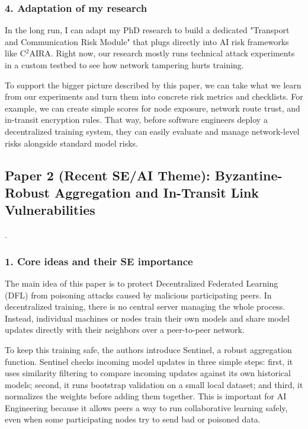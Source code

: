 \documentclass[11pt,a4paper]{article}
\begin{document}
\subsubsection*{4. Adaptation of my research}

In the long run, I can adapt my PhD research to build a dedicated "Transport and Communication Risk Module" that plugs directly into AI risk frameworks like C$^2$AIRA. Right now, our research mostly runs technical attack experiments in a custom testbed to see how network tampering hurts training.

To support the bigger picture described by this paper, we can take what we learn from our experiments and turn them into concrete risk metrics and checklists. For example, we can create simple scores for node exposure, network route trust, and in-transit encryption rules. That way, before software engineers deploy a decentralized training system, they can easily evaluate and manage network-level risks alongside standard model risks.

\subsection{Paper 2 (Recent SE/AI Theme): Byzantine-Robust Aggregation and In-Transit Link Vulnerabilities \cite{feng2024sentinel}}.

\subsubsection*{1. Core ideas and their SE importance}

The main idea of this paper is to protect Decentralized Federated Learning (DFL) from poisoning attacks caused by malicious participating peers. In decentralized training, there is no central server managing the whole process. Instead, individual machines or nodes train their own models and share model updates directly with their neighbors over a peer-to-peer network.

To keep this training safe, the authors introduce Sentinel, a robust aggregation function. Sentinel checks incoming model updates in three simple steps: first, it uses similarity filtering to compare incoming updates against its own historical models; second, it runs bootstrap validation on a small local dataset; and third, it normalizes the weights before adding them together. This is important for AI Engineering because it allows peers a way to run collaborative learning safely, even when some participating nodes try to send bad or poisoned data.
\end{document}
